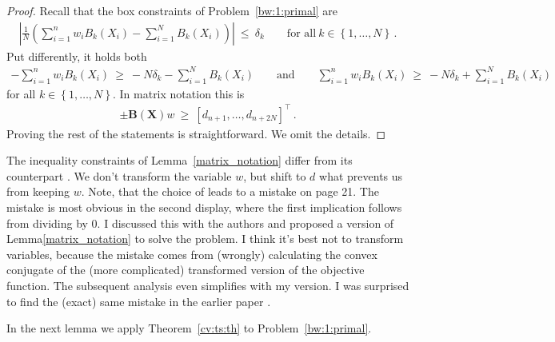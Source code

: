 \begin{proof}
  Recall that the box constraints of Problem~\ref{bw:1:primal} are
  \begin{gather*}
        \left| 
      \frac{1}{N} 
      \left( 
      \sum_{i = 1}^{n} 
      w_i
      B_k(X_i)
      -
      \sum_{i=1}^{N} 
      B_k(X_i)
      \right)
    \right|
    \ 
    \le 
    \ 
    \delta_k
    \qquad
    \text{for all}\ 
    k\in \left\{ 1,\ldots, N \right\}
    \,.
  \end{gather*}
  Put differently, it holds both
  \begin{align*}
    -
      \sum_{i = 1}^{n} 
      w_i
      B_k(X_i)
      \ 
    \ge 
      \ 
    -
    N
    \delta_k
      -
      \sum_{i=1}^{N} 
      B_k(X_i)
      \qquad 
    \text{and}
      \qquad
      \sum_{i = 1}^{n} 
      w_i
      B_k(X_i)
      \ 
    \ge 
      \ 
    -
    N
    \delta_k
      +
      \sum_{i=1}^{N} 
      B_k(X_i)
  \end{align*}
  for all 
  $
    k\in \left\{ 1,\ldots, N \right\}
  $. In matrix notation this is 
  \begin{gather*}
    \pm\mathbf{B}(\mathbf{X})w
    \ 
    \ge
    \ 
    [d_{n+1},\ldots, d_{n+  2 N}]^\top
    \,.
  \end{gather*}
  Proving the rest of the statements is straightforward. We omit the details.
\end{proof}
\begin{remark}
  The inequality constraints of
  Lemma~\ref{matrix_notation} differ from its counterpart
  \cite[Proof of Lemma~1]{Wang2019}.
  We don't transform the variable $w$, but shift to $d$ what prevents us from keeping $w$.
  Note, that the choice of
  \cite[Proof of Lemma~1]{Wang2019} leads to a mistake on page 21.
  The mistake is most obvious in the second display, where the first implication follows from dividing by 0.
  I discussed this with the authors and proposed a version of Lemma\ref{matrix_notation} to solve the problem. I think it's best not to transform variables, because the mistake comes from (wrongly) calculating the convex conjugate of the (more complicated) transformed version of the objective function. The subsequent analysis even simplifies with my version.
  I was surprised to find the (exact) same mistake in the earlier paper 
  \cite[page 35 second display]{Chan2016}. 
\end{remark}
%
In the next lemma we apply Theorem~\ref{cv:ts:th} to Problem~\ref{bw:1:primal}.
%
